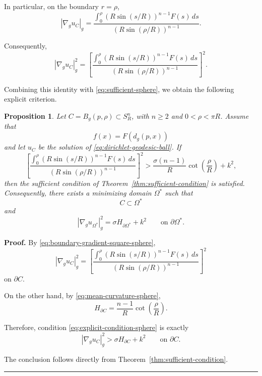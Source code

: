 \documentclass{article}
\renewcommand{\boxed}[1]{#1}
\newtheorem{proposition}[theorem]{Proposition}
\newenvironment{proof}[1][Proof]{\textbf{#1.} }{\ \rule{0.5em}{0.5em}}
\begin{document}
In particular, on the boundary $r=\rho$,
\begin{equation}
\boxed{
|\nabla_g u_C|_g
=
\frac{
\displaystyle
\int_0^\rho
\left(R\sin(s/R)\right)^{n-1}
F(s)\,ds
}{
\left(R\sin(\rho/R)\right)^{n-1}
}.
}
\label{eq:boundary-gradient-sphere}
\end{equation}

Consequently,
\begin{equation}
|\nabla_g u_C|_g^2
=
\left[
\frac{
\displaystyle
\int_0^\rho
\left(R\sin(s/R)\right)^{n-1}
F(s)\,ds
}{
\left(R\sin(\rho/R)\right)^{n-1}
}
\right]^2.
\label{eq:boundary-gradient-square-sphere}
\end{equation}

Combining this identity with
\eqref{eq:sufficient-sphere}, we obtain the following explicit
criterion.

\begin{proposition}
\label{prop:explicit-sphere-condition}
Let $C=B_g(p,\rho)\subset S_R^n$, with $n\geq2$ and
$0<\rho<\pi R$. Assume that
\[
f(x)=F(d_g(p,x))
\]
and let $u_C$ be the solution of
\eqref{eq:dirichlet-geodesic-ball}. If
\begin{equation}
\boxed{
\left[
\frac{
\displaystyle
\int_0^\rho
\left(R\sin(s/R)\right)^{n-1}
F(s)\,ds
}{
\left(R\sin(\rho/R)\right)^{n-1}
}
\right]^2
>
\frac{\sigma(n-1)}{R}
\cot\left(\frac{\rho}{R}\right)
+
k^2,
}
\label{eq:explicit-condition-sphere}
\end{equation}
then the sufficient condition of
Theorem~\ref{thm:sufficient-condition} is satisfied.
Consequently, there exists a minimizing domain $\Omega^\ast$ such that
\[
C\subset\Omega^\ast
\]
and
\begin{equation}
|\nabla_g u_{\Omega^\ast}|_g^2
=
\sigma H_{\partial\Omega^\ast}+k^2
\qquad\text{on }\partial\Omega^\ast.
\label{eq:free-boundary-sphere-example}
\end{equation}
\end{proposition}

\begin{proof}
By \eqref{eq:boundary-gradient-square-sphere},
\[
|\nabla_g u_C|_g^2
=
\left[
\frac{
\displaystyle
\int_0^\rho
\left(R\sin(s/R)\right)^{n-1}
F(s)\,ds
}{
\left(R\sin(\rho/R)\right)^{n-1}
}
\right]^2
\]
on $\partial C$.

On the other hand, by
\eqref{eq:mean-curvature-sphere},
\[
H_{\partial C}
=
\frac{n-1}{R}
\cot\left(\frac{\rho}{R}\right).
\]

Therefore, condition
\eqref{eq:explicit-condition-sphere} is exactly
\[
|\nabla_g u_C|_g^2
>
\sigma H_{\partial C}+k^2
\qquad\text{on }\partial C.
\]

The conclusion follows directly from
Theorem~\ref{thm:sufficient-condition}.
\end{proof}
\end{document}
